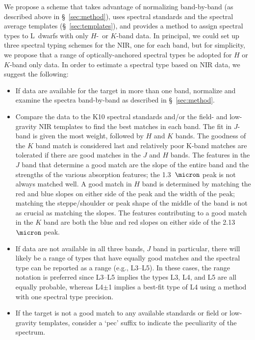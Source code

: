 \documentclass[12pt,preprint]{aastex}
\begin{document}
We propose a scheme that takes advantage of normalizing band-by-band (as described above in \S~\ref{sec:method}), uses spectral standards and the spectral average templates (\S~\ref{sec:templates}), and provides a method to assign spectral types to L~dwarfs with only $H$-~or $K$-band data. 
In principal, we could set up three spectral typing schemes for the NIR, one for each band, but for simplicity, we propose that a range of optically-anchored spectral types be adopted for $H$ or $K$-band only data.
In order to estimate a spectral type based on NIR data, we suggest the following:
\begin{itemize}
	\item If data are available for the target in more than one band, normalize and examine the spectra band-by-band as described in \S~\ref{sec:method}.
	\item Compare the data to the K10 spectral standards and/or the field- and low-gravity NIR templates to find the best matches in each band. 
	The fit in $J$-band is given the most weight, followed by $H$ and $K$ bands. The goodness of the $K$ band match is considered last and relatively poor K-band matches are tolerated if there are good matches in the $J$ and $H$ bands. 
	The features in the $J$ band that determine a good match are the slope of the entire band and the strengths of the various absorption features; the 1.3~$\micron$ peak is not always matched well. 
	A good match in $H$ band is determined by matching the red and blue slopes on either side of the peak and the width of the peak; matching the steppe/shoulder or peak shape of the middle of the band is not as crucial as matching the slopes. 
The features contributing to a good match in the $K$ band are both the blue and red slopes on either side of the 2.13~$\micron$ peak.	
	\item If data are not available in all three bands, $J$ band in particular, there will likely be a range of types that have equally good matches and the spectral type can be reported as a range (e.g., L3--L5). In these cases, the range notation is preferred since L3--L5 implies the types L3, L4, and L5 are all equally probable, whereas L4$\pm$1 implies a best-fit type of L4 using a method with one spectral type precision.
	\item If the target is not a good match to any available standards or field or low-gravity templates, consider a `pec' suffix to indicate the peculiarity of the spectrum.

\end{itemize}
\end{document}
